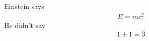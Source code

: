Einstein says
\begin{align*}
E = mc^2 \label{clever}
\end{align*}
He didn’t say
\begin{align*}
1 + 1 = 3 \tag{dumb}
\end{align*}